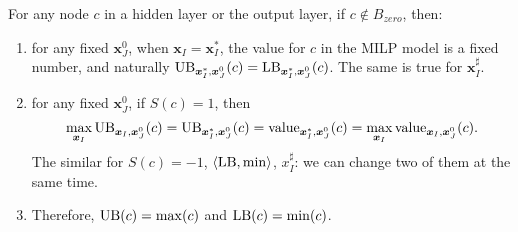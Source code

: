 			
			\begin{lemma} \label{lem:main}
				For any node $c$ in a hidden layer or the output layer, if $c\notin B_{zero}$, then:		\begin{enumerate}
					\item for any fixed $\boldsymbol{x}^0_J$, when  $\boldsymbol{x}_I=\boldsymbol{x}^*_I$, the value for $c$ in the MILP model is a fixed number, and naturally $\mathrm{UB}_{\boldsymbol{x}^*_I,\boldsymbol{x}^0_J}(c)=\mathrm{LB}_{\boldsymbol{x}^*_I,\boldsymbol{x}^0_J}(c)$. The same is true for $\boldsymbol{x}^\sharp_I$.
					
					\item for any fixed $\boldsymbol{x}^0_J$, if $S(c)=1$, then $$\max_{\boldsymbol{x}_I} \mathrm{UB}_{\boldsymbol{x}_I,\boldsymbol{x}^0_J}(c)=\mathrm{UB}_{\boldsymbol{x}^*_I,\boldsymbol{x}^0_J}(c)= {\textrm{value}}_{\boldsymbol{x}^*_I,\boldsymbol{x}^0_J}(c) = \max_{\boldsymbol{x}_I} {\textrm{value}}_{\boldsymbol{x}_I,\boldsymbol{x}^0_J}(c).$$ The similar for $S(c)=-1$, $\langle \mathrm{LB},\min\rangle$, $x^\sharp_I$: we can change two of them at the same time.
					
					\item Therefore, $\mathrm{UB}(c)=\max(c)$ and $\mathrm{LB}(c)=\min(c)$.
				\end{enumerate}
				
				
				
			\end{lemma}
			
